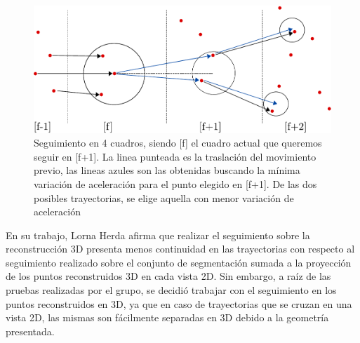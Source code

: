 \begin{figure}[hbt]
\begin{center}
\includegraphics[scale=0.8]{img/Tracking/tracking-eps-converted-to.pdf}
\end{center}
\caption{Seguimiento en 4 cuadros, siendo [f] el cuadro actual que queremos seguir en [f+1]. La linea punteada es la traslación del movimiento previo, las lineas azules son las obtenidas buscando la mínima variación de aceleración para el punto elegido en [f+1]. De las dos posibles trayectorias, se elige aquella con menor variación de aceleración}
\label{herda_00}
\end{figure}

En su trabajo, Lorna Herda afirma que realizar el seguimiento sobre la reconstrucción 3D presenta menos continuidad en las trayectorias con respecto al seguimiento realizado sobre el conjunto de segmentación sumada a la proyección de los puntos reconstruidos 3D en cada vista 2D. Sin embargo, a raíz de las pruebas realizadas por el grupo, se decidió trabajar con el seguimiento en los puntos reconstruidos en 3D, ya que en caso de trayectorias que se cruzan en una vista 2D, las mismas son fácilmente separadas en 3D debido a la geometría presentada.
\\ 

